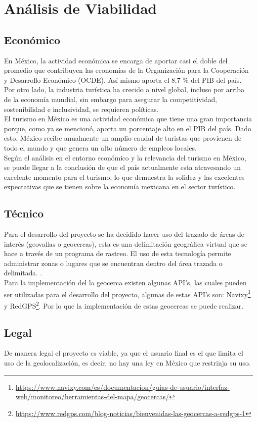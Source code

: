 \section{Análisis de Viabilidad}

\subsection{Económico}

En México, la actividad económica se encarga de aportar casi el doble del promedio que contribuyen las economías de la Organización para la Cooperación y Desarrollo Económico (OCDE). Así mismo aporta el 8.7 \% del PIB del país. \\

Por otro lado, la industria turística ha crecido a nivel global, incluso por arriba de la economía mundial, sin embargo para asegurar la competitividad, sostenibilidad e inclusividad, se requieren políticas. \cite{turismoEnMexico}\\ 

El turismo en México es una actividad económica que tiene una gran importancia porque, como ya se mencionó, aporta un porcentaje alto en el PIB del país. Dado esto, México recibe anualmente un amplio caudal de turistas que provienen de todo el mundo y que genera un alto número de empleos locales.\cite{importanciaTurismo} \\

Según el análisis en el entorno económico y la relevancia del turismo en México, se puede llegar a la conclusión de que el país actualmente esta atravesando un excelente momento para el turismo, lo que demuestra la solidez y las excelentes expectativas que se tienen sobre la economía mexicana en el sector turístico.\\

\subsection{Técnico}

Para el desarrollo del proyecto se ha decidido hacer uso del trazado de áreas de interés (geovallas o geocercas), esta es una delimitación geográfica virtual que se hace a través de un programa de rastreo. El uso de esta tecnología permite administrar zonas o lugares que se encuentran dentro del área trazada o delimitada. \cite{geovalla}. \\

Para la implementación del la geocerca existen algunas API's, las cuales pueden ser utilizadas para el desarrollo del proyecto, algunas de estas API's son: Navixy\footnote{\url{https://www.navixy.com/es/documentacion/guias-de-usuario/interfaz-web/monitoreo/herramientas-del-mapa/geocercas/}} y RedGPS\footnote{\url{https://www.redgps.com/blog-noticias/bienvenidas-las-geocercas-a-redgps-1}}. Por lo que la implementación de estas geocercas se puede realizar.

 \subsection{Legal}

De manera legal el proyecto es viable, ya que el usuario final es el que limita el uso de la geolocalización, es decir, no hay una ley en México que restrinja su uso. 
